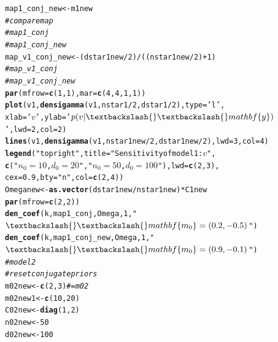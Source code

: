 \documentclass[12pt]{article}\usepackage[]{graphicx}\usepackage[]{color}
\makeatletter
\newcommand{\hlnum}[1]{\textcolor[rgb]{0.686,0.059,0.569}{#1}}%
\newcommand{\hlstr}[1]{\textcolor[rgb]{0.192,0.494,0.8}{#1}}%
\newcommand{\hlcom}[1]{\textcolor[rgb]{0.678,0.584,0.686}{\textit{#1}}}%
\newcommand{\hlopt}[1]{\textcolor[rgb]{0,0,0}{#1}}%
\newcommand{\hlstd}[1]{\textcolor[rgb]{0.345,0.345,0.345}{#1}}%
\newcommand{\hlkwb}[1]{\textcolor[rgb]{0.69,0.353,0.396}{#1}}%
\newcommand{\hlkwc}[1]{\textcolor[rgb]{0.333,0.667,0.333}{#1}}%
\newcommand{\hlkwd}[1]{\textcolor[rgb]{0.737,0.353,0.396}{\textbf{#1}}}%
\newenvironment{kframe}{%
 \def\at@end@of@kframe{}%
 \ifinner\ifhmode%
  \def\at@end@of@kframe{\end{minipage}}%
  \begin{minipage}{\columnwidth}%
 \fi\fi%
 \def\FrameCommand##1{\hskip\@totalleftmargin \hskip-\fboxsep
 \colorbox{shadecolor}{##1}\hskip-\fboxsep
     \hskip-\linewidth \hskip-\@totalleftmargin \hskip\columnwidth}%
 \MakeFramed {\advance\hsize-\width
   \@totalleftmargin\z@ \linewidth\hsize
   \@setminipage}}%
 {\par\unskip\endMakeFramed%
 \at@end@of@kframe}
\newenvironment{knitrout}{}{} %
\makeatother
\begin{document}
\begin{knitrout}
\begin{kframe}
\begin{alltt}
\hlstd{map1_conj_new} \hlkwb{<-} \hlstd{m1new}
\hlcom{# compare map}
\hlcom{# map1_conj}
\hlcom{# map1_conj_new}
\hlstd{map_v1_conj_new} \hlkwb{<-} \hlstd{(dstar1new} \hlopt{/} \hlnum{2}\hlstd{)} \hlopt{/} \hlstd{((nstar1new} \hlopt{/} \hlnum{2}\hlstd{)} \hlopt{+} \hlnum{1}\hlstd{)}
\hlcom{# map_v1_conj}
\hlcom{# map_v1_conj_new}
\hlkwd{par}\hlstd{(}\hlkwc{mfrow} \hlstd{=} \hlkwd{c}\hlstd{(}\hlnum{1}\hlstd{,} \hlnum{1}\hlstd{),} \hlkwc{mar} \hlstd{=} \hlkwd{c}\hlstd{(}\hlnum{4}\hlstd{,} \hlnum{4}\hlstd{,} \hlnum{1}\hlstd{,} \hlnum{1}\hlstd{))}
\hlkwd{plot}\hlstd{(v1,} \hlkwd{densigamma}\hlstd{(v1, nstar1} \hlopt{/} \hlnum{2}\hlstd{, dstar1} \hlopt{/} \hlnum{2}\hlstd{),} \hlkwc{type} \hlstd{=} \hlstr{'l'}\hlstd{,}
     \hlkwc{xlab} \hlstd{=} \hlstr{'$v$'}\hlstd{,} \hlkwc{ylab} \hlstd{=} \hlstr{'$p(v|\textbackslash{}\textbackslash{}mathbf\{y\})$'}\hlstd{,} \hlkwc{lwd} \hlstd{=} \hlnum{2}\hlstd{,} \hlkwc{col} \hlstd{=} \hlnum{2}\hlstd{)}
\hlkwd{lines}\hlstd{(v1,} \hlkwd{densigamma}\hlstd{(v1, nstar1new} \hlopt{/} \hlnum{2}\hlstd{, dstar1new} \hlopt{/} \hlnum{2}\hlstd{),} \hlkwc{lwd} \hlstd{=} \hlnum{3}\hlstd{,} \hlkwc{col} \hlstd{=} \hlnum{4}\hlstd{)}
\hlkwd{legend}\hlstd{(}\hlstr{"topright"}\hlstd{,} \hlkwc{title} \hlstd{=} \hlstr{"Sensitivity of model 1: $v$"}\hlstd{,}
       \hlkwd{c}\hlstd{(}\hlstr{"$n_0 = 10$, $d_0 = 20$"}\hlstd{,} \hlstr{"$n_0 = 50$, $d_0 = 100$"}\hlstd{),} \hlkwc{lwd} \hlstd{=} \hlkwd{c}\hlstd{(}\hlnum{2}\hlstd{,} \hlnum{3}\hlstd{),}
       \hlkwc{cex} \hlstd{=} \hlnum{0.9}\hlstd{,} \hlkwc{bty} \hlstd{=} \hlstr{"n"}\hlstd{,} \hlkwc{col} \hlstd{=} \hlkwd{c}\hlstd{(}\hlnum{2}\hlstd{,} \hlnum{4}\hlstd{))}
\hlstd{Omeganew} \hlkwb{<-} \hlkwd{as.vector}\hlstd{(dstar1new} \hlopt{/} \hlstd{nstar1new)} \hlopt{*} \hlstd{C1new}
\hlkwd{par}\hlstd{(}\hlkwc{mfrow} \hlstd{=} \hlkwd{c}\hlstd{(}\hlnum{2}\hlstd{,} \hlnum{2}\hlstd{))}
\hlkwd{den_coef}\hlstd{(k, map1_conj, Omega,} \hlnum{1}\hlstd{,} \hlstr{"$\textbackslash{}\textbackslash{}mathbf\{m_0\} = (0.2, -0.5)$"}\hlstd{)}
\hlkwd{den_coef}\hlstd{(k, map1_conj_new, Omega,} \hlnum{1}\hlstd{,} \hlstr{"$\textbackslash{}\textbackslash{}mathbf\{m_0\} = (0.9, -0.1)$"}\hlstd{)}
\hlcom{# model 2}
\hlcom{# reset conjugate priors}
\hlstd{m02new} \hlkwb{<-} \hlkwd{c}\hlstd{(}\hlnum{2}\hlstd{,} \hlnum{3}\hlstd{)} \hlcom{# = m02}
\hlstd{m02new1} \hlkwb{<-} \hlkwd{c}\hlstd{(}\hlnum{10}\hlstd{,} \hlnum{20}\hlstd{)}
\hlstd{C02new} \hlkwb{<-} \hlkwd{diag}\hlstd{(}\hlnum{1}\hlstd{,} \hlnum{2}\hlstd{)}
\hlstd{n02new} \hlkwb{<-} \hlnum{50}
\hlstd{d02new} \hlkwb{<-} \hlnum{100}


\end{alltt}
\end{kframe}
\end{knitrout}
\end{document}
